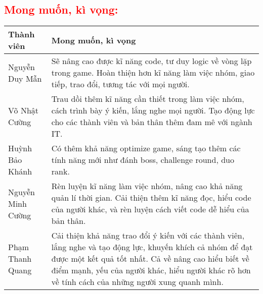 \documentclass{article}
\begin{document}
\textcolor{red}{\section{\Large{Mong muốn, kì vọng:}}}

\begin{table}[h]

\centering {} \small

\begin{tabular}{|p{3cm}|p{10cm}|}

\hline

\textbf{Thành viên} & \textbf{ Mong muốn, kì vọng}\par \\ \hline

Nguyễn Duy Mẫn & Sẽ nâng cao được kĩ năng code, tư duy logic về vòng lặp trong game. Hoàn thiện hơn kĩ năng làm việc nhóm, giao tiếp, trao đổi, tương tác với mọi người.  \par\\ \hline

Võ Nhật Cường & Trau dồi thêm kĩ năng cần thiết trong làm việc nhóm, cách trình bày ý kiến, lắng nghe mọi người. Tạo động lực cho các thành viên và bản thân thêm đam mê với ngành IT.  \par\\ \hline

Huỳnh Bảo Khánh & Có thêm khả năng optimize game, sáng tạo thêm các tính năng mới như đánh boss, challenge round, duo rank. \par \\ \hline

Nguyễn Minh Cường & Rèn luyện kĩ năng làm việc nhóm, nâng cao khả năng quản lí thời gian. Cải thiện thêm kĩ năng đọc, hiểu code của người khác, và rèn luyện cách viết code dễ hiểu của bản thân. \par \\ \hline
    
Phạm Thanh Quang & Cải thiện khả năng trao đổi ý kiến với các thành viên, lắng nghe và tạo động lực, khuyến khích cả nhóm để đạt được một kết quả tốt nhất. Cả về nâng cao hiểu biết về điểm mạnh, yếu của người khác, hiểu người khác rõ hơn về tính cách của những người xung quanh mình. \par \\ \hline


\end{tabular}

\end{table}
\end{document}
